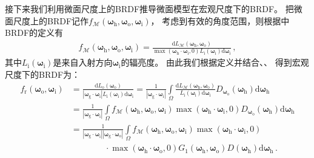 接下来我们利用微面尺度上的BRDF推导微面模型在宏观尺度下的BRDF。
把微面尺度上的BRDF记作$f_{\mathcal{M}}({\bm\omega}_{\mathrm{h}},{\bm\omega}_{\mathrm{o}},{\bm\omega}_{\mathrm{i}})$，
考虑到有效的角度范围，则根据中BRDF的定义有
\begin{align}\label{eq:08ex01-MicrosurfaceBRDF}
    f_{\mathcal{M}}({\bm\omega}_{\mathrm{h}},{\bm\omega}_{\mathrm{o}},{\bm\omega}_{\mathrm{i}})
    =\frac{\mathrm{d} L_{\mathcal{M}}({\bm\omega}_{\mathrm{h}},{\bm\omega}_{\mathrm{o}})}
    {\max({\bm\omega}_{\mathrm{h}}\cdot{\bm\omega}_{\mathrm{i}},0)
    L_{\mathrm{i}}({\bm\omega}_{\mathrm{i}})\mathrm{d}{\bm\omega}_{\mathrm{i}}}\, ,
\end{align}
其中$L_{\mathrm{i}}({\bm\omega}_{\mathrm{i}})$是来自入射方向${\bm\omega}_{\mathrm{i}}$的辐亮度。
由此我们根据定义并结合、、
得到宏观尺度下的BRDF为：
\begin{align}\label{eq:08ex01-MacroBRDFG1}
    f_{\mathrm{r}}({\bm\omega}_{\mathrm{o}},{\bm\omega}_{\mathrm{i}})
     & = \frac{\mathrm{d} L_{\mathrm{o}}({\bm\omega}_{\mathrm{o}})}
    {|{\bm\omega}_{\mathrm{g}}\cdot{\bm\omega}_{\mathrm{i}}|
    L_{\mathrm{i}}({\bm\omega}_{\mathrm{i}})\mathrm{d}{\bm\omega}_{\mathrm{i}}}
    = \frac{1}{|{\bm\omega}_{\mathrm{g}}\cdot{\bm\omega}_{\mathrm{i}}|}
    \int\limits_{\varOmega}\frac{\mathrm{d}L_{\mathcal{M}}({\bm\omega}_{\mathrm{h}},{\bm\omega}_{\mathrm{o}})}
    {L_{\mathrm{i}}({\bm\omega}_{\mathrm{i}})\mathrm{d}{\bm\omega}_{\mathrm{i}}}
    D_{{\bm\omega}_{\mathrm{o}}}({\bm\omega}_{\mathrm{h}})\mathrm{d}{\bm\omega}_{\mathrm{h}}\nonumber \\
     & = \frac{1}{|{\bm\omega}_{\mathrm{g}}\cdot{\bm\omega}_{\mathrm{i}}|}
    \int\limits_{\varOmega}f_{\mathcal{M}}({\bm\omega}_{\mathrm{h}},{\bm\omega}_{\mathrm{o}},{\bm\omega}_{\mathrm{i}})
    \max({\bm\omega}_{\mathrm{h}}\cdot{\bm\omega}_{\mathrm{i}},0)
    D_{{\bm\omega}_{\mathrm{o}}}({\bm\omega}_{\mathrm{h}})\mathrm{d}{\bm\omega}_{\mathrm{h}}\nonumber \\
     & = \frac{1}{|{\bm\omega}_{\mathrm{g}}\cdot{\bm\omega}_{\mathrm{i}}|
    |{\bm\omega}_{\mathrm{g}}\cdot{\bm\omega}_{\mathrm{o}}|}
    \int\limits_{\varOmega}f_{\mathcal{M}}({\bm\omega}_{\mathrm{h}},{\bm\omega}_{\mathrm{o}},{\bm\omega}_{\mathrm{i}})
    \max({\bm\omega}_{\mathrm{h}}\cdot{\bm\omega}_{\mathrm{i}},0)\nonumber                            \\
     & \qquad\qquad\cdot\max({\bm\omega}_{\mathrm{h}}\cdot{\bm\omega}_{\mathrm{o}},0)
    G_1({\bm\omega}_{\mathrm{h}},{\bm\omega}_{\mathrm{o}})
    D({\bm\omega}_{\mathrm{h}})\mathrm{d}{\bm\omega}_{\mathrm{h}}\, .
\end{align}


